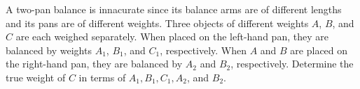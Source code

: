 A two-pan balance is innacurate since its balance arms are of different lengths and its pans are of different weights. Three objects of different weights $A$,  $B$,  and $C$ are each weighed separately. When placed on the left-hand pan, they are balanced by weights $A_1$,  $B_1$,  and $C_1$,  respectively. When $A$ and $B$ are placed on the right-hand pan, they are balanced by $A_2$ and $B_2$,  respectively. Determine the true weight of $C$ in terms of $A_1, B_1, C_1, A_2$,  and $B_2$.